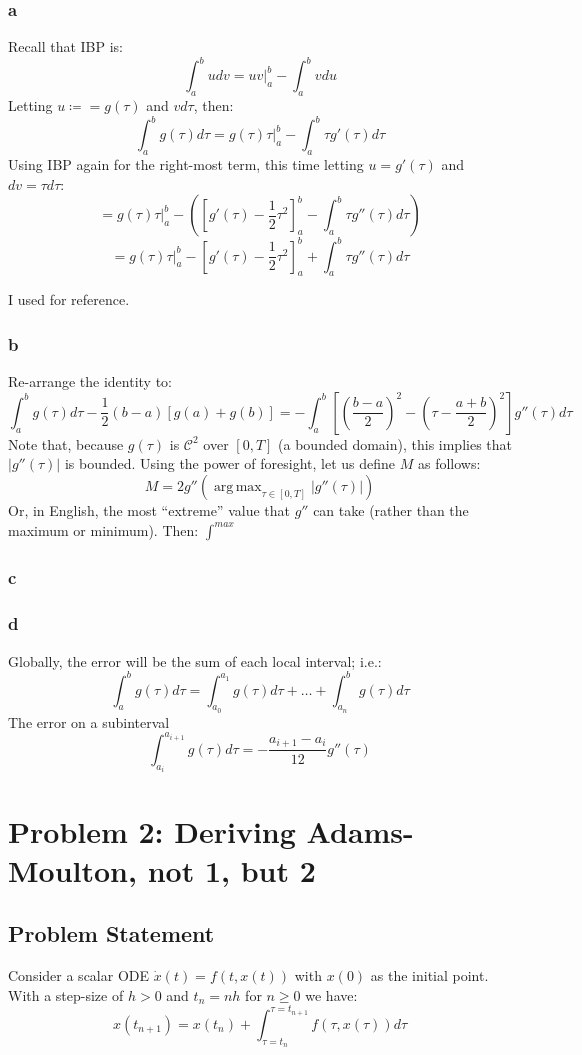 \documentclass[11pt]{report}
\theoremstyle{definition}
\DeclareMathOperator*{\argmax}{arg\,max}
\begin{document}
\subsubsection*{a}
Recall that IBP is:
\[ \int_a^b udv = uv\bigg|_a^b - \int_a^b vdu \]
Letting $u\coloneqq=g(\tau)$ and $vd\tau$, then:
\[ \int_a^bg(\tau)d\tau = g(\tau)\tau\bigg|_a^b - \int_a^b\tau g'(\tau)d\tau \]
Using IBP again for the right-most term, this time letting $u=g'(\tau)$ and $dv=\tau d\tau$:
\[
	= g(\tau)\tau\bigg|_a^b - \left(
	\left[g'(\tau)-\frac{1}{2}\tau^2\right]_a^b
	- \int_a^b\tau g''(\tau)d\tau
	\right)
\]
\[
	= g(\tau)\tau\bigg|_a^b -
	\left[g'(\tau)-\frac{1}{2}\tau^2\right]_a^b
	+ \int_a^b\tau g''(\tau)d\tau
\]



I used \cite{Bender} for reference.
\subsubsection*{b}
Re-arrange the identity to:
\[
	\int_a^bg(\tau)d\tau - \frac{1}{2}(b-a)[g(a)+g(b)] = -\int_a^b\left[
		\left(\frac{b-a}{2}\right)^2-\left(\tau - \frac{a+b}{2}\right)^2
		\right] g''(\tau)d\tau
\]
Note that, because $g(\tau)$ is $\mathcal{C}^2$ over $[0,T]$ (a bounded domain),
this implies that $|g''(\tau)|$ is bounded.
Using the power of foresight, let us define $M$ as follows:
\[M = 2g''\left(\argmax_{\tau\in[0,T]}|g''(\tau)|\right)\]
Or, in English, the most ``extreme'' value that $g''$ can take (rather than the
maximum or minimum). Then:
$\int_{}^{max}$

\subsubsection*{c}
\subsubsection*{d}
Globally, the error will be the sum of each local interval; i.e.:
\[
	\int_{a}^{b}g(\tau)d\tau = \int_{a_0}^{a_1}g(\tau)d\tau + \ldots + \int_{a_{n}}^{b}g(\tau)d\tau
\]
The error on a subinterval
\[\int_{a_{i}}^{a_{i+1}} g(\tau)d\tau= -\frac{a_{i+1}-a_{i}}{12}g''(\tau)\]

\newpage
\section*{Problem 2: Deriving Adams-Moulton, not 1, but 2}
\subsection*{Problem Statement}
Consider a scalar ODE $\dot{x}(t)=f(t,x(t))$ with $x(0)$ as the initial point.
With a step-size of $h>0$ and $t_n=nh$ for $n\geq 0$ we have:
\[ x(t_{n+1}) = x(t_n)+\int_{\tau=t_n}^{\tau=t_{n+1}} f(\tau, x(\tau))d\tau \]
\end{document}
